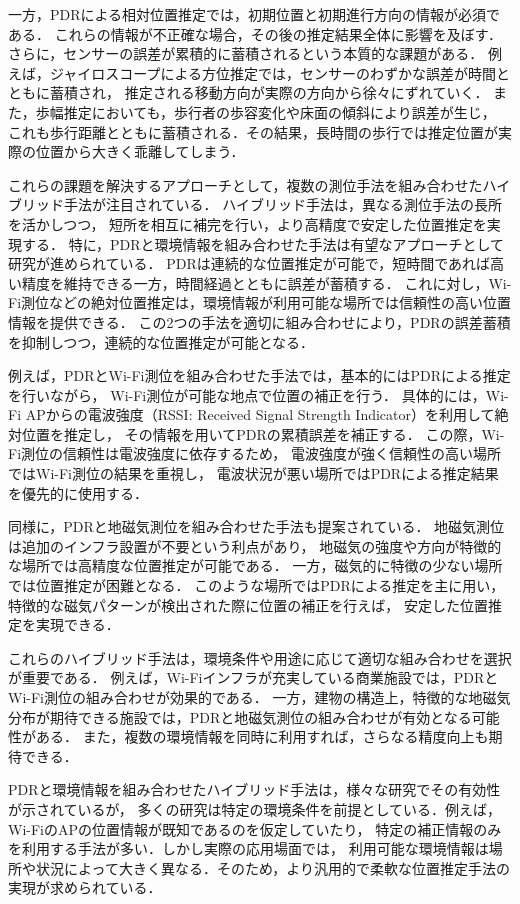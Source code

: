 一方，PDRによる相対位置推定では，初期位置と初期進行方向の情報が必須である．
これらの情報が不正確な場合，その後の推定結果全体に影響を及ぼす．
さらに，センサーの誤差が累積的に蓄積されるという本質的な課題がある．
例えば，ジャイロスコープによる方位推定では，センサーのわずかな誤差が時間とともに蓄積され，
推定される移動方向が実際の方向から徐々にずれていく．
また，歩幅推定においても，歩行者の歩容変化や床面の傾斜により誤差が生じ，
これも歩行距離とともに蓄積される．その結果，長時間の歩行では推定位置が実際の位置から大きく乖離してしまう．

これらの課題を解決するアプローチとして，複数の測位手法を組み合わせたハイブリッド手法が注目されている．
ハイブリッド手法は，異なる測位手法の長所を活かしつつ，
短所を相互に補完を行い，より高精度で安定した位置推定を実現する．
特に，PDRと環境情報を組み合わせた手法は有望なアプローチとして研究が進められている．
PDRは連続的な位置推定が可能で，短時間であれば高い精度を維持できる一方，時間経過とともに誤差が蓄積する．
これに対し，Wi-Fi測位などの絶対位置推定は，環境情報が利用可能な場所では信頼性の高い位置情報を提供できる．
この2つの手法を適切に組み合わせにより，PDRの誤差蓄積を抑制しつつ，連続的な位置推定が可能となる．

例えば，PDRとWi-Fi測位を組み合わせた手法では，基本的にはPDRによる推定を行いながら，
Wi-Fi測位が可能な地点で位置の補正を行う．
具体的には，Wi-Fi APからの電波強度（RSSI: Received Signal Strength Indicator）を利用して絶対位置を推定し，
その情報を用いてPDRの累積誤差を補正する．
この際，Wi-Fi測位の信頼性は電波強度に依存するため，
電波強度が強く信頼性の高い場所ではWi-Fi測位の結果を重視し，
電波状況が悪い場所ではPDRによる推定結果を優先的に使用する．

同様に，PDRと地磁気測位を組み合わせた手法も提案されている．
地磁気測位は追加のインフラ設置が不要という利点があり，
地磁気の強度や方向が特徴的な場所では高精度な位置推定が可能である．
一方，磁気的に特徴の少ない場所では位置推定が困難となる．
このような場所ではPDRによる推定を主に用い，
特徴的な磁気パターンが検出された際に位置の補正を行えば，
安定した位置推定を実現できる．

これらのハイブリッド手法は，環境条件や用途に応じて適切な組み合わせを選択が重要である．
例えば，Wi-Fiインフラが充実している商業施設では，PDRとWi-Fi測位の組み合わせが効果的である．
一方，建物の構造上，特徴的な地磁気分布が期待できる施設では，PDRと地磁気測位の組み合わせが有効となる可能性がある．
また，複数の環境情報を同時に利用すれば，さらなる精度向上も期待できる．

PDRと環境情報を組み合わせたハイブリッド手法は，様々な研究でその有効性が示されているが，
多くの研究は特定の環境条件を前提としている．例えば，Wi-FiのAPの位置情報が既知であるのを仮定していたり，
特定の補正情報のみを利用する手法が多い．しかし実際の応用場面では，
利用可能な環境情報は場所や状況によって大きく異なる．そのため，より汎用的で柔軟な位置推定手法の実現が求められている．

